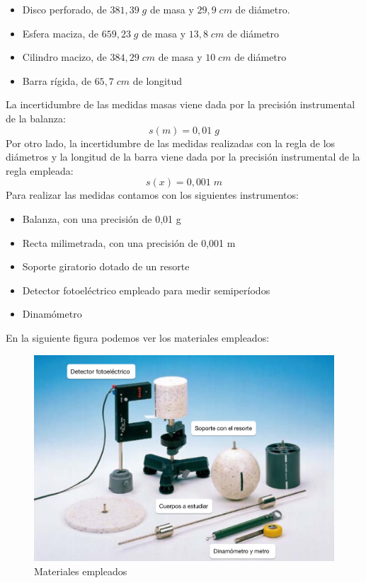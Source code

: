 \documentclass[a4paper,12pt,titlepage]{article}
\begin{document}
\begin{itemize}
    \item Disco perforado, de $381,39 \;g$ de masa y $29,9 \; cm$ de diámetro.
    \item Esfera maciza, de $659,23 \; g$ de masa y $13,8 \; cm$ de diámetro
    \item Cilindro macizo, de $384,29 \; cm $ de masa y $10 \; cm$ de diámetro
    \item Barra rígida, de $65,7 \; cm$ de longitud
\end{itemize}
La incertidumbre de las medidas masas viene dada por la precisión instrumental de la balanza:
\begin{equation}
    s(m) = 0,01 \; g
\end{equation}
Por otro lado, la incertidumbre de las medidas realizadas con la regla de los diámetros y la longitud de la barra viene dada por la precisión instrumental de la regla empleada:
\begin{equation}
    s(x) = 0,001 \;m
\end{equation}
Para realizar las medidas contamos con los siguientes instrumentos:

\begin{itemize}
    \item Balanza, con una precisión de 0,01 g
    \item Recta milimetrada, con una precisión de 0,001 m
    \item Soporte giratorio dotado de un resorte
    \item Detector fotoeléctrico empleado para medir semiperíodos
    \item Dinamómetro
\end{itemize}

En la siguiente figura podemos ver los materiales empleados:

\begin{figure}[h!]
    \centering
    \includegraphics[width=0.75\linewidth]{Images/Material MI-1.jpg}
    \caption{Materiales empleados}
\end{figure}
\end{document}
